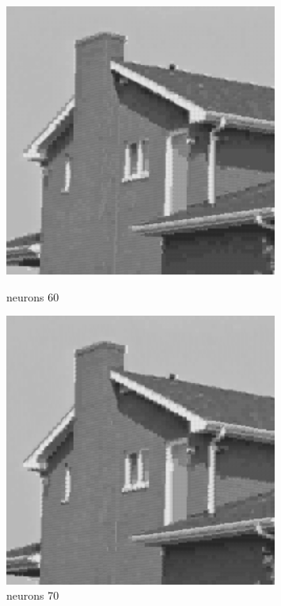 \documentclass[../IDP_Task5_Karwowski_Kowalewski.tex]{subfiles}
\begin{document}
{{        \begin{figure}[!htbp]
            \begin{minipage}[c]{0.45\linewidth}
                \centering
                \includegraphics[width=0.8\textwidth]{img/kowalewski/crop_size_4_neurons_60.png}
                \caption{neurons 60}
            \end{minipage}\hfill
            \begin{minipage}[c]{0.45\linewidth}
                \centering
                \includegraphics[width=0.8\textwidth]{img/kowalewski/crop_size_4_neurons_70.png}
                \caption{neurons 70}
            \end{minipage}
        \end{figure}

}}
\end{document}
